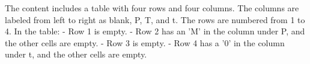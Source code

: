 The content includes a table with four rows and four columns. The columns are labeled from left to right as blank, P, T, and t. The rows are numbered from 1 to 4. In the table:
- Row 1 is empty.
- Row 2 has an 'M' in the column under P, and the other cells are empty.
- Row 3 is empty.
- Row 4 has a '0' in the column under t, and the other cells are empty.